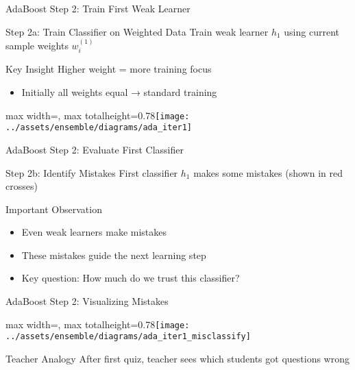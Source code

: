 \documentclass[10pt]{beamer}
\newcommand{\fitpic}[1]{\begin{adjustbox}{max width=\linewidth, max totalheight=0.78\textheight}#1\end{adjustbox}}
\begin{document}
\begin{frame}{AdaBoost Step 2: Train First Weak Learner}
\begin{alertbox}{Step 2a: Train Classifier on Weighted Data}
Train weak learner $h_1$ using current sample weights $w_i^{(1)}$
\end{alertbox}

\begin{keypointsbox}{Key Insight}
Higher weight = more training focus
\begin{itemize}
\item Initially all weights equal → standard training
\end{itemize}
\end{keypointsbox}

  \vspace{0.3cm}
  \centering
  \fitpic{\texttt{[image: ../assets/ensemble/diagrams/ada\_iter1]}}
\end{frame}

\begin{frame}{AdaBoost Step 2: Evaluate First Classifier}
\begin{alertbox}{Step 2b: Identify Mistakes}
First classifier $h_1$ makes some mistakes (shown in red crosses)
\end{alertbox}

\begin{keypointsbox}{Important Observation}
\begin{itemize}
\item Even weak learners make mistakes
\item These mistakes guide the next learning step
\item Key question: How much do we trust this classifier?
\end{itemize}
\end{keypointsbox}
\end{frame}

\begin{frame}{AdaBoost Step 2: Visualizing Mistakes}
  \vspace{0.3cm}
  \centering
  \fitpic{\texttt{[image: ../assets/ensemble/diagrams/ada\_iter1\_misclassify]}}

\begin{examplebox}{Teacher Analogy}
After first quiz, teacher sees which students got questions wrong
\end{examplebox}
\end{frame}
\end{document}
